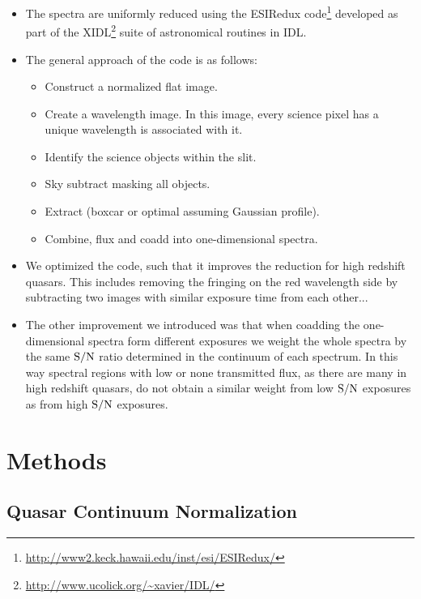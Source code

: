 \documentclass[iop]{emulateapj}
\begin{document}
\begin{itemize}
\item The spectra are uniformly reduced using the ESIRedux code\footnote{\url{http://www2.keck.hawaii.edu/inst/esi/ESIRedux/}} developed as part of the XIDL\footnote{\url{http://www.ucolick.org/~xavier/IDL/}} suite of astronomical routines in IDL. 
\item The general approach of the code is as follows: 
\begin{itemize}
\item Construct a normalized flat image. 
\item Create a wavelength image. In this image, every science pixel has a unique wavelength is associated with it. 
\item Identify the science objects within the slit.
\item Sky subtract masking all objects. %
\item Extract (boxcar or optimal assuming Gaussian profile). 
\item Combine, flux and coadd into one-dimensional spectra. 
\end{itemize}
\item We optimized the code, such that it improves the reduction for high redshift quasars. This includes removing the fringing on the red wavelength side by subtracting two images with similar exposure time from each other... 
\item The other improvement we introduced was that when coadding the one-dimensional spectra form different exposures we weight the whole spectra by the same $\rm S/N$ ratio determined in the continuum of each spectrum. In this way spectral regions with low or none transmitted flux, as there are many in high redshift quasars, do not obtain a similar weight from low $\rm S/N$ exposures as from high $\rm S/N$ exposures. 
\end{itemize}





\section{Methods}\label{sec:methods}

\subsection{Quasar Continuum Normalization}
\end{document}

